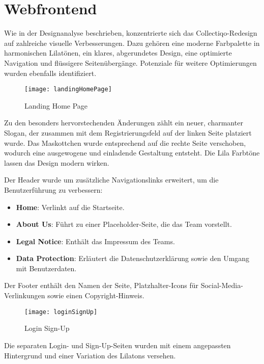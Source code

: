 \section{Webfrontend}\label{subsec:subsection-four-one}

Wie in der Designanalyse beschrieben, konzentrierte sich das Collectiqo-Redesign auf zahlreiche visuelle Verbesserungen.
Dazu gehören eine moderne Farbpalette in harmonischen Lilatönen, ein klares, abgerundetes Design, eine optimierte Navigation und flüssigere Seitenübergänge.
Potenziale für weitere Optimierungen wurden ebenfalls identifiziert.

\begin{figure}[h]
    \centering
    \texttt{[image: landingHomePage]}
    \caption{Landing Home Page}
    \label{fig:landingHomePage}
\end{figure}

Zu den besonders hervorstechenden Änderungen zählt ein neuer, charmanter Slogan, der zusammen mit dem Registrierungsfeld auf der linken Seite platziert wurde.
Das Maskottchen wurde entsprechend auf die rechte Seite verschoben, wodurch eine ausgewogene und einladende Gestaltung entsteht.
Die Lila Farbtöne lassen das Design modern wirken.

Der Header wurde um zusätzliche Navigationslinks erweitert, um die Benutzerführung zu verbessern:
\begin{itemize}
    \item \textbf{Home}: Verlinkt auf die Startseite.
    \item \textbf{About Us}: Führt zu einer Placeholder-Seite, die das Team vorstellt.
    \item \textbf{Legal Notice}: Enthält das Impressum des Teams.
    \item \textbf{Data Protection}: Erläutert die Datenschutzerklärung sowie den Umgang mit Benutzerdaten.
\end{itemize}

Der Footer enthält den Namen der Seite, Platzhalter-Icons für Social-Media-Verlinkungen sowie einen Copyright-Hinweis.

\begin{figure}[h]
    \centering
    \texttt{[image: loginSignUp]}
    \caption{Login Sign-Up}
    \label{fig:loginSignUp}
\end{figure}

\pagebreak

Die separaten Login- und Sign-Up-Seiten wurden mit einem angepassten Hintergrund und einer Variation des Lilatons versehen.

